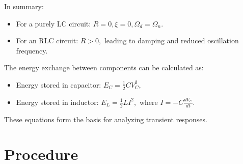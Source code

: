 \documentclass[journal]{IEEEtran}
\begin{document}
In summary:
\begin{itemize}
	\item For a purely LC circuit: \(R = 0, \xi = 0, \Omega_d = \Omega_n.\)
	\item For an RLC circuit: \(R > 0,\) leading to damping and reduced oscillation frequency.
\end{itemize}

The energy exchange between components can be calculated as:
\begin{itemize}
	\item Energy stored in capacitor: \(E_C = \frac{1}{2} C V_C^2,\)
	\item Energy stored in inductor: \(E_L = \frac{1}{2} L I^2,\) where \(I = -C \frac{dV_C}{dt}.\)
\end{itemize}

These equations form the basis for analyzing transient responses.

\section{Procedure}
\end{document}
